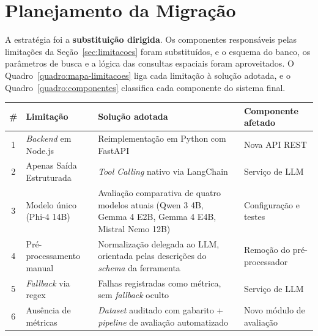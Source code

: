 \section{Planejamento da Migração}

A estratégia foi a \textbf{substituição dirigida}. Os componentes responsáveis pelas limitações da Seção~\ref{sec:limitacoes} foram substituídos, e o esquema do banco, os parâmetros de busca e a lógica das consultas espaciais foram aproveitados. O Quadro~\ref{quadro:mapa-limitacoes} liga cada limitação à solução adotada, e o Quadro~\ref{quadro:componentes} classifica cada componente do sistema final.

\begin{quadro}[h]
\centering
\caption{Mapeamento entre limitações do protótipo e soluções adotadas}
\label{quadro:mapa-limitacoes}
\small
\begin{tabular}{|c|>{\raggedright\arraybackslash}p{4.2cm}|>{\raggedright\arraybackslash}p{4.2cm}|>{\raggedright\arraybackslash}p{3.2cm}|}
\hline
\textbf{\#} & \textbf{Limitação} & \textbf{Solução adotada} & \textbf{Componente afetado} \\
\hline
1 & \textit{Backend} em Node.js & Reimplementação em Python com FastAPI & Nova API REST \\
\hline
2 & Apenas Saída Estruturada & \textit{Tool Calling} nativo via LangChain & Serviço de LLM \\
\hline
3 & Modelo único (Phi-4 14B) & Avaliação comparativa de quatro modelos atuais (Qwen 3 4B, Gemma 4 E2B, Gemma 4 E4B, Mistral Nemo 12B) & Configuração e testes \\
\hline
4 & Pré-processamento manual & Normalização delegada ao LLM, orientada pelas descrições do \textit{schema} da ferramenta & Remoção do pré-processador \\
\hline
5 & \textit{Fallback} via regex & Falhas registradas como métrica, sem \textit{fallback} oculto & Serviço de LLM \\
\hline
6 & Ausência de métricas & \textit{Dataset} auditado com gabarito + \textit{pipeline} de avaliação automatizado & Novo módulo de avaliação \\
\hline
\end{tabular}%
\end{quadro}


